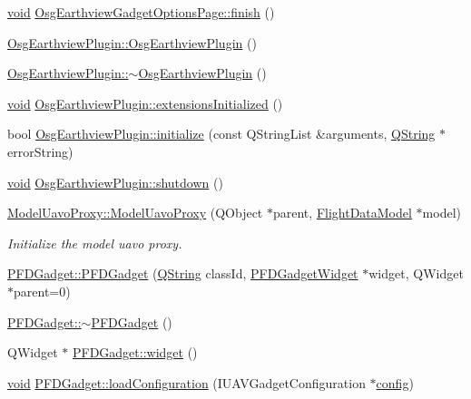 \begin{DoxyCompactItemize}
\item 
\hyperlink{group___u_a_v_objects_plugin_ga444cf2ff3f0ecbe028adce838d373f5c}{void} \hyperlink{group___o_p_map_plugin_gaa2fbdbeced73248edc1b001ba9294684}{Osg\-Earthview\-Gadget\-Options\-Page\-::finish} ()
\item 
\hyperlink{group___o_p_map_plugin_ga695dc06ca46ce6939cf95ef27f90be72}{Osg\-Earthview\-Plugin\-::\-Osg\-Earthview\-Plugin} ()
\item 
\hyperlink{group___o_p_map_plugin_ga67b03faca8613bf17a0623ae18791913}{Osg\-Earthview\-Plugin\-::$\sim$\-Osg\-Earthview\-Plugin} ()
\item 
\hyperlink{group___u_a_v_objects_plugin_ga444cf2ff3f0ecbe028adce838d373f5c}{void} \hyperlink{group___o_p_map_plugin_ga67c92e6b50be6d0152700ea331726933}{Osg\-Earthview\-Plugin\-::extensions\-Initialized} ()
\item 
bool \hyperlink{group___o_p_map_plugin_gad25998380d6a05042f2a787e6ea00cee}{Osg\-Earthview\-Plugin\-::initialize} (const Q\-String\-List \&arguments, \hyperlink{group___u_a_v_objects_plugin_gab9d252f49c333c94a72f97ce3105a32d}{Q\-String} $\ast$error\-String)
\item 
\hyperlink{group___u_a_v_objects_plugin_ga444cf2ff3f0ecbe028adce838d373f5c}{void} \hyperlink{group___o_p_map_plugin_gac453d0b59f26d74b1a48cf92c59b9d8e}{Osg\-Earthview\-Plugin\-::shutdown} ()
\item 
\hyperlink{group___o_p_map_plugin_ga42f653c17585ad777a3b74b7c561cfaa}{Model\-Uavo\-Proxy\-::\-Model\-Uavo\-Proxy} (Q\-Object $\ast$parent, \hyperlink{class_flight_data_model}{Flight\-Data\-Model} $\ast$model)
\begin{DoxyCompactList}\small\item\em Initialize the model uavo proxy. \end{DoxyCompactList}\item 
\hyperlink{group___o_p_map_plugin_ga64f9ebd08e8c35c1b7b034f1e2ffe9bc}{P\-F\-D\-Gadget\-::\-P\-F\-D\-Gadget} (\hyperlink{group___u_a_v_objects_plugin_gab9d252f49c333c94a72f97ce3105a32d}{Q\-String} class\-Id, \hyperlink{class_p_f_d_gadget_widget}{P\-F\-D\-Gadget\-Widget} $\ast$widget, Q\-Widget $\ast$parent=0)
\item 
\hyperlink{group___o_p_map_plugin_ga8c86763f729f03d070b2fed80bbc36ea}{P\-F\-D\-Gadget\-::$\sim$\-P\-F\-D\-Gadget} ()
\item 
Q\-Widget $\ast$ \hyperlink{group___o_p_map_plugin_ga61807d4db8adc6952197c390f73bfcda}{P\-F\-D\-Gadget\-::widget} ()
\item 
\hyperlink{group___u_a_v_objects_plugin_ga444cf2ff3f0ecbe028adce838d373f5c}{void} \hyperlink{group___o_p_map_plugin_ga2789c1f4ec7af3eff76f4e84551d4fe5}{P\-F\-D\-Gadget\-::load\-Configuration} (I\-U\-A\-V\-Gadget\-Configuration $\ast$\hyperlink{deflate_8c_a4473b5227787415097004fd39f55185e}{config})

\end{DoxyCompactItemize}
